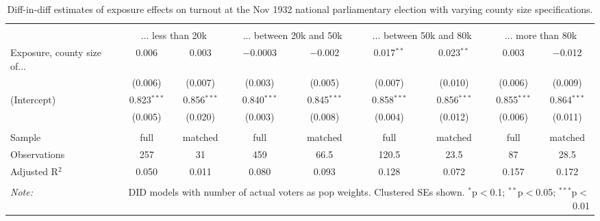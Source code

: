 
\begin{table}[!htbp] \centering 
  \caption{Diff-in-diff estimates of exposure effects on turnout at the Nov 1932 national parliamentary election with varying county size specifications.\vspace{-.25cm}} 
  \label{tab:turnout-countysize-dd-1932-2} 
\scriptsize 
\begin{tabular}{@{\extracolsep{5pt}}lcccccccc} 
\\[-1.8ex]\hline 
\hline \\[-1.8ex] 
 & \multicolumn{2}{c}{... less than 20k } & \multicolumn{2}{c}{... between 20k and 50k} & \multicolumn{2}{c}{... between 50k and 80k} & \multicolumn{2}{c}{... more than 80k} \\ 
 \cmidrule(r){2-3}\cmidrule(r){4-5}\cmidrule(r){6-7}\cmidrule(r){8-9}Exposure, county size of... & 0.006 & 0.003 & $-$0.0003 & $-$0.002 & 0.017$^{**}$ & 0.023$^{**}$ & 0.003 & $-$0.012 \\ 
  & (0.006) & (0.007) & (0.003) & (0.005) & (0.007) & (0.010) & (0.006) & (0.009) \\ 
  (Intercept) & 0.823$^{***}$ & 0.856$^{***}$ & 0.840$^{***}$ & 0.845$^{***}$ & 0.858$^{***}$ & 0.856$^{***}$ & 0.855$^{***}$ & 0.864$^{***}$ \\ 
  & (0.005) & (0.020) & (0.003) & (0.008) & (0.004) & (0.012) & (0.006) & (0.011) \\ 
 \hline \\[-1.8ex] 
Sample & full & matched & full & matched & full & matched & full & matched \\ 
Observations & 257 & 31 & 459 & 66.5 & 120.5 & 23.5 & 87 & 28.5 \\ 
Adjusted R$^{2}$ & 0.050 & 0.011 & 0.080 & 0.093 & 0.128 & 0.072 & 0.157 & 0.172 \\ 
\hline 
\hline \\[-1.8ex] 
\textit{Note:}  & \multicolumn{8}{r}{DID models with number of actual voters as pop weights. Clustered SEs shown. $^{*}$p$<$0.1; $^{**}$p$<$0.05; $^{***}$p$<$0.01} \\ 
\end{tabular} 
\end{table} 
